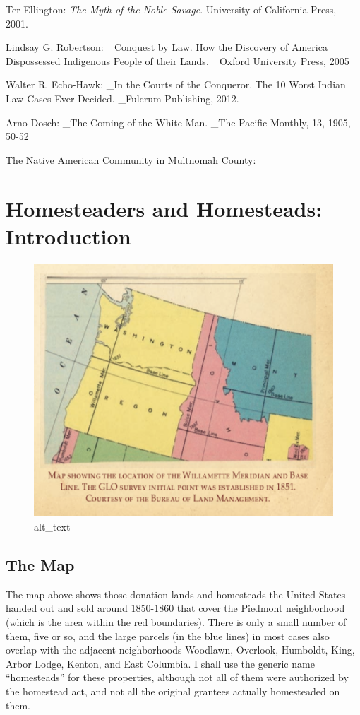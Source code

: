 \documentclass[
  12pt,
]{book}
\begin{document}
Ter Ellington: \emph{The Myth of the Noble Savage}. University of California Press, 2001.

Lindsay G. Robertson: \_Conquest by Law. How the Discovery of America Dispossessed Indigenous People of their Lands. \_Oxford University Press, 2005

Walter R. Echo-Hawk: \_In the Courts of the Conqueror. The 10 Worst Indian Law Cases Ever Decided. \_Fulcrum Publishing, 2012.

Arno Dosch: \_The Coming of the White Man. \_The Pacific Monthly, 13, 1905, 50-52

The Native American Community in Multnomah County:

\hypertarget{homesteaders-and-homesteads-introduction}{%
\chapter{Homesteaders and Homesteads: Introduction}\label{homesteaders-and-homesteads-introduction}}

\begin{figure}
\centering
\includegraphics{images/02_images/image1.png}
\caption{alt\_text}
\end{figure}

\hypertarget{the-map}{%
\section{The Map}\label{the-map}}

The map above shows those donation lands and homesteads the United States handed out and sold around 1850-1860 that cover the Piedmont neighborhood (which is the area within the red boundaries). There is only a small number of them, five or so, and the large parcels (in the blue lines) in most cases also overlap with the adjacent neighborhoods Woodlawn, Overlook, Humboldt, King, Arbor Lodge, Kenton, and East Columbia. I shall use the generic name ``homesteads'' for these properties, although not all of them were authorized by the homestead act, and not all the original grantees actually homesteaded on them.
\end{document}
